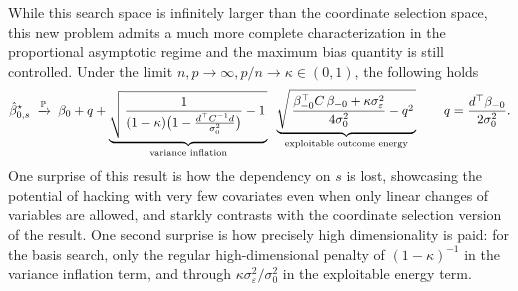 While this search space is infinitely larger than the coordinate selection space, this new problem admits a much more complete characterization in the proportional asymptotic regime and the maximum bias quantity is still controlled. Under the limit $n, p \rightarrow \infty, p/n \to \kappa \in (0,1)$, the following holds
\begin{equation}\label{eq:relaxed-rmt}
        \hat\beta_{0,s}^\star
        \;\xrightarrow{\mathbb{P}}\;
        \beta_0 + q +
        \underbrace{\sqrt{\,\frac{1}{(1-\kappa)\big(1-\tfrac{d^\top C^{-1}d}{\sigma_0^2}\big)}-1\,}}_{\text{variance inflation}}\;\;
        \underbrace{\sqrt{\,\frac{\beta_{-0}^\top C\,\beta_{-0}+\kappa\sigma_\varepsilon^2}{4\sigma_0^2}-q^{2}\,}}_{\text{exploitable outcome energy}} \qquad q = \frac{d^\top\beta_{-0}}{2\sigma_0^2}.
\end{equation}
One surprise of this result is how the dependency on $s$ is lost, showcasing the potential of hacking with very few covariates even when only linear changes of variables are allowed, and starkly contrasts with the coordinate selection version of the result. One second surprise is how precisely high dimensionality is paid: for the basis search, only the regular high-dimensional penalty of $(1-\kappa)^{-1}$ in the variance inflation term, and through $\kappa \sigma_{\varepsilon}^2 / \sigma_0^2$ in the exploitable energy term. 

